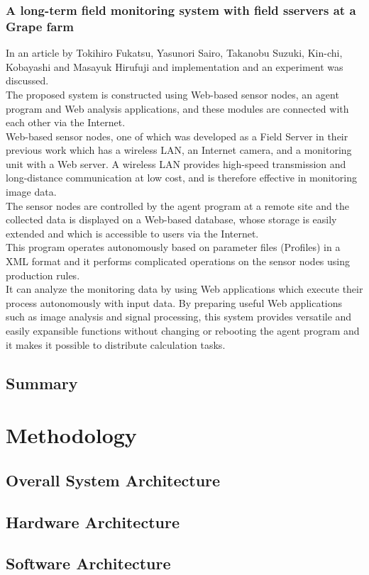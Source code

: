\documentclass[12pt, a4paper]{article}
\begin{document}
\subsubsection{A long-term field monitoring system with field sservers at a Grape farm}
In an article by Tokihiro Fukatsu, Yasunori Sairo, Takanobu Suzuki, Kin-chi, Kobayashi and Masayuk Hirufuji and  implementation and an experiment was discussed.\\
The proposed system is constructed using Web-based sensor nodes, an agent program and Web analysis applications, and these modules are connected with each other via the Internet.\\ 
Web-based sensor nodes, one of which was developed as a Field Server in their previous work which has a wireless LAN, an Internet camera, and a monitoring unit with a Web server. A wireless LAN provides high-speed transmission and long-distance communication at low cost, and is therefore effective in monitoring image data.\\
The sensor nodes are controlled by the agent program at a remote site and the collected data is displayed on a Web-based database, whose storage is easily extended and which is accessible to users via the Internet.\\ 
This program operates autonomously based on parameter files (Profiles) in a XML format and it performs complicated operations on the sensor nodes using production rules.\\
It can analyze the monitoring data by using Web applications which execute their process autonomously with input data. By preparing useful Web applications such as image analysis and signal processing, this system provides versatile and easily expansible functions without changing or rebooting the agent program and it makes it possible to distribute calculation tasks.
\subsection{Summary}
\newpage

\section{Methodology}
\subsection{Overall System Architecture}
\subsection{Hardware Architecture}
\subsection{Software Architecture}
\end{document}
